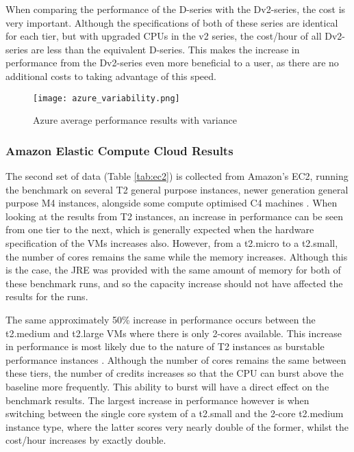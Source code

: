 \documentclass[conference]{IEEEtran}
\begin{document}
When comparing the performance of the D-series with the Dv2-series, the cost is very important. Although the specifications of both of these series are identical for each tier, but with upgraded CPUs in the v2 series, the cost/hour of all Dv2-series are less than the equivalent D-series. This makes the increase in performance from the Dv2-series even more beneficial to a user, as there are no additional costs to taking advantage of this speed.



\begin{figure}[ht]
  \centering
  \texttt{[image: azure\_variability.png]}
  \caption{Azure average performance results with variance}
  \label{fig:azurevariability}
\end{figure}

\subsubsection{Amazon Elastic Compute Cloud Results}\label{sec:eval:awsresults}

The second set of data (Table \ref{tab:ec2}) is collected from Amazon's EC2, running the benchmark on several T2 general purpose instances, newer generation general purpose M4 instances, alongside some compute optimised C4 machines \cite{awsvmtype}. When looking at the results from T2 instances, an increase in performance can be seen from one tier to the next, which is generally expected when the hardware specification of the VMs increases also. However, from a t2.micro to a t2.small, the number of cores remains the same while the memory increases. Although this is the case, the JRE was provided with the same amount of memory for both of these benchmark runs, and so the capacity increase should not have affected the results for the runs.

The same approximately 50\% increase in performance occurs between the t2.medium and t2.large VMs where there is only 2-cores available. This increase in performance is most likely due to the nature of T2 instances as burstable performance instances \cite{awsvmtype}. Although the number of cores remains the same between these tiers, the number of credits increases so that the CPU can burst above the baseline more frequently. This ability to burst will have a direct effect on the benchmark results. The largest increase in performance however is when switching between the single core system of a t2.small and the 2-core t2.medium instance type, where the latter scores very nearly double of the former, whilst the cost/hour increases by exactly double.
\end{document}
